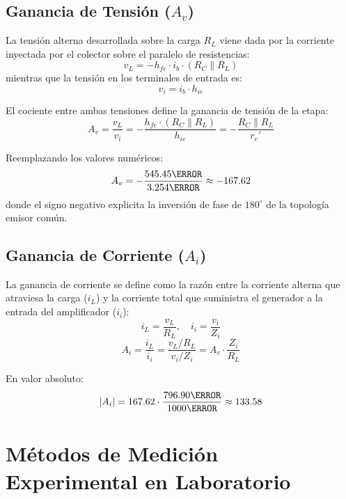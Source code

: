 \subsection{Ganancia de Tensión (\texorpdfstring{$A_v$}{Av})}
La tensión alterna desarrollada sobre la carga $R_L$ viene dada por la corriente inyectada por el colector sobre el
paralelo de resistencias:
\begin{equation}
  v_L = -h_{fe} \cdot i_b \cdot (R_C \parallel R_L)
\end{equation}
mientras que la tensión en los terminales de entrada es:
\begin{equation}
  v_i = i_b \cdot h_{ie}
\end{equation}

El cociente entre ambas tensiones define la ganancia de tensión de la etapa:
\begin{equation}
  A_v = \frac{v_L}{v_i} = -\frac{h_{fe} \cdot (R_C \parallel R_L)}{h_{ie}} = -\frac{R_C \parallel R_L}{r_e'}
  \label{eq:Av_formula}
\end{equation}

Reemplazando los valores numéricos:
\begin{equation}
  A_v = -\frac{545.45\ohm}{3.254\ohm} \approx -167.62
  \label{eq:Av_teorica}
\end{equation}
donde el signo negativo explicita la inversión de fase de $180^\circ$ de la topología emisor común.

\subsection{Ganancia de Corriente (\texorpdfstring{$A_i$}{Ai})}
La ganancia de corriente se define como la razón entre la corriente alterna que atraviesa la carga ($i_L$) y la
corriente total que suministra el generador a la entrada del amplificador ($i_i$):
\begin{equation}
  i_L = \frac{v_L}{R_L}, \quad i_i = \frac{v_i}{Z_i}
\end{equation}
\begin{equation}
  A_i = \frac{i_L}{i_i} = \frac{v_L / R_L}{v_i / Z_i} = A_v \cdot \frac{Z_i}{R_L}
  \label{eq:Ai_formula}
\end{equation}

En valor absoluto:
\begin{equation}
  |A_i| = 167.62 \cdot \frac{796.90\ohm}{1000\ohm} \approx 133.58
  \label{eq:Ai_teorica}
\end{equation}

\section{Métodos de Medición Experimental en Laboratorio}

